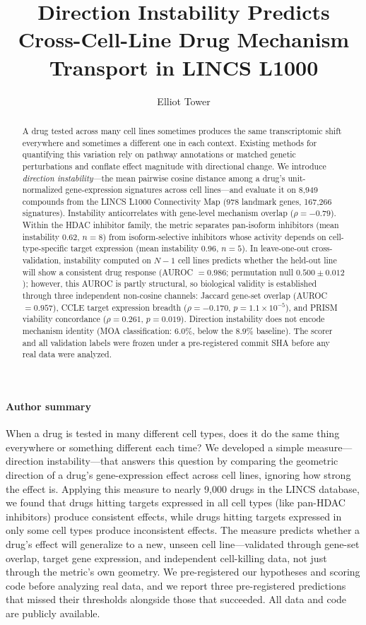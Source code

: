 \documentclass[11pt]{article}
\title{Direction Instability Predicts Cross-Cell-Line Drug Mechanism Transport in LINCS L1000}
\author{Elliot Tower}
\affil{Independent researcher \\ \texttt{elliot@elliottower.ai}}
\date{}
\begin{document}
\maketitle

\begin{abstract}
A drug tested across many cell lines sometimes produces the same
transcriptomic shift everywhere and sometimes a different one in each
context.  Existing methods for quantifying this variation rely on
pathway annotations or matched genetic perturbations and conflate
effect magnitude with directional change.  We introduce \emph{direction
instability}---the mean pairwise cosine distance among a drug's
unit-normalized gene-expression signatures across cell lines---and
evaluate it on 8{,}949 compounds from the LINCS L1000 Connectivity Map
(978 landmark genes, 167{,}266 signatures).  Instability anticorrelates
with gene-level mechanism overlap ($\rho = -0.79$).  Within the HDAC
inhibitor family, the metric separates pan-isoform inhibitors (mean
instability 0.62, $n = 8$) from isoform-selective inhibitors whose
activity depends on cell-type-specific target expression (mean
instability 0.96, $n = 5$).  In leave-one-out cross-validation,
instability computed on $N{-}1$ cell lines predicts whether the
held-out line will show a consistent drug response (AUROC $= 0.986$;
permutation null $0.500 \pm 0.012$); however, this AUROC is partly
structural, so biological validity is established through three
independent non-cosine channels: Jaccard gene-set overlap
(AUROC $= 0.957$), CCLE target expression breadth
($\rho = -0.170$, $p = 1.1 \times 10^{-5}$), and PRISM viability
concordance ($\rho = 0.261$, $p = 0.019$).  Direction instability
does not encode mechanism identity (MOA classification: $6.0\%$,
below the $8.9\%$ baseline).  The scorer and all validation labels
were frozen under a pre-registered commit SHA before any real data
were analyzed.
\end{abstract}

\paragraph*{Author summary}
When a drug is tested in many different cell types, does it do the same
thing everywhere or something different each time?  We developed a
simple measure---direction instability---that answers this question by
comparing the geometric direction of a drug's gene-expression effect
across cell lines, ignoring how strong the effect is.  Applying this
measure to nearly 9{,}000 drugs in the LINCS database, we found that
drugs hitting targets expressed in all cell types (like pan-HDAC
inhibitors) produce consistent effects, while drugs hitting targets
expressed in only some cell types produce inconsistent effects.  The
measure predicts whether a drug's effect will generalize to a new,
unseen cell line---validated through gene-set overlap, target gene
expression, and independent cell-killing data, not just through
the metric's own geometry.  We pre-registered our hypotheses and scoring
code before analyzing real data, and we report three pre-registered
predictions that missed their thresholds alongside those that
succeeded.  All data and code are publicly available.
\end{document}
